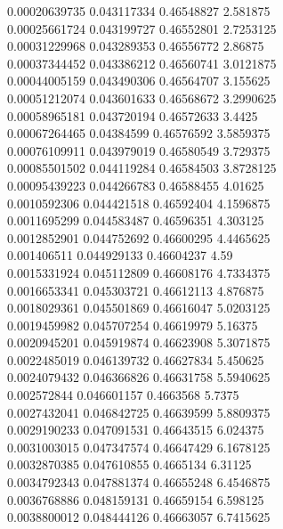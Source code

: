 {0.00020639735 0.043117334 0.46548827 2.581875\\
0.00025661724 0.043199727 0.46552801 2.7253125\\
0.00031229968 0.043289353 0.46556772 2.86875\\
0.00037344452 0.043386212 0.46560741 3.0121875\\
0.00044005159 0.043490306 0.46564707 3.155625\\
0.00051212074 0.043601633 0.46568672 3.2990625\\
0.00058965181 0.043720194 0.46572633 3.4425\\
0.00067264465 0.04384599 0.46576592 3.5859375\\
0.00076109911 0.043979019 0.46580549 3.729375\\
0.00085501502 0.044119284 0.46584503 3.8728125\\
0.00095439223 0.044266783 0.46588455 4.01625\\
0.0010592306 0.044421518 0.46592404 4.1596875\\
0.0011695299 0.044583487 0.46596351 4.303125\\
0.0012852901 0.044752692 0.46600295 4.4465625\\
0.001406511 0.044929133 0.46604237 4.59\\
0.0015331924 0.045112809 0.46608176 4.7334375\\
0.0016653341 0.045303721 0.46612113 4.876875\\
0.0018029361 0.045501869 0.46616047 5.0203125\\
0.0019459982 0.045707254 0.46619979 5.16375\\
0.0020945201 0.045919874 0.46623908 5.3071875\\
0.0022485019 0.046139732 0.46627834 5.450625\\
0.0024079432 0.046366826 0.46631758 5.5940625\\
0.002572844 0.046601157 0.4663568 5.7375\\
0.0027432041 0.046842725 0.46639599 5.8809375\\
0.0029190233 0.047091531 0.46643515 6.024375\\
0.0031003015 0.047347574 0.46647429 6.1678125\\
0.0032870385 0.047610855 0.4665134 6.31125\\
0.0034792343 0.047881374 0.46655248 6.4546875\\
0.0036768886 0.048159131 0.46659154 6.598125\\
0.0038800012 0.048444126 0.46663057 6.7415625\\
}
